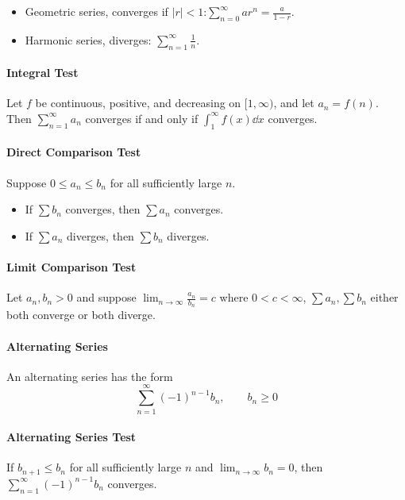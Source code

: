\documentclass[oneside]{book}
\begin{document}
\begin{itemize}
    \item Geometric series, converges if $|r|<1$:$\sum_{n=0}^{\infty} ar^n=\frac{a}{1-r}$. 
    
    \item Harmonic series, diverges: $\sum_{n=1}^{\infty}\frac1n$.
\end{itemize}

\paragraph{Integral Test}{
Let $f$ be continuous, positive, and decreasing on $[1,\infty)$, and let $a_n=f(n)$. Then
$\sum_{n=1}^{\infty} a_n$ converges if and only if
$\int_1^{\infty} f(x)\dd x$ converges.
}

\paragraph{Direct Comparison Test}{
Suppose $0\leq a_n\leq b_n$ for all sufficiently large $n$. 
\begin{itemize}
    \item If $\sum b_n$ converges, then $\sum a_n$ converges.
    \item If $\sum a_n$ diverges, then $\sum b_n$ diverges.
\end{itemize}
}

\paragraph{Limit Comparison Test}
Let $a_n,b_n>0$ and suppose $\lim_{n\to\infty}\frac{a_n}{b_n}=c$ where $0<c<\infty$, $\sum a_n, \sum b_n$ either both converge or both diverge.


\paragraph{Alternating Series}
An alternating series has the form
\[
    \sum_{n=1}^{\infty}(-1)^{n-1}b_n, \qquad b_n\geq 0
\]

\paragraph{Alternating Series Test}
If $b_{n+1}\leq b_n$ for all sufficiently large $n$ and $\lim_{n\to\infty}b_n=0$, then
$\sum_{n=1}^{\infty}(-1)^{n-1}b_n$ converges.
\end{document}
